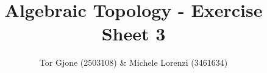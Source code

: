 \documentclass[a4paper,11pt,english]{article}
\title{\textbf{Algebraic Topology} - Exercise Sheet 3}
\author{Tor Gjone (2503108) \& Michele Lorenzi (3461634)}
\begin{document}
\mmaketitle


\begin{exercise}[1]

\end{exercise}


\begin{exercise}[2]

\end{exercise}


\begin{exercise}[3]

\end{exercise}
\end{document}
